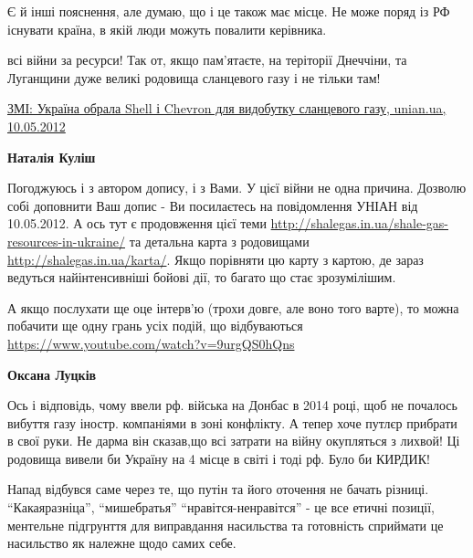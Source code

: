 \begin{itemize}

Є й інші пояснення, але думаю, що і це також має місце. Не може поряд із РФ
існувати країна, в якій люди можуть повалити керівника.


всі війни за ресурси! Так от, якщо пам'ятаєте, на теріторії Днеччіни, та
Луганщини дуже великі родовища сланцевого газу і не тільки там! 

\href{https://www.unian.ua/society/647199-zmi-ukrajina-obrala-shell-i-chevron-dlya-vidobutku-slantsevogo-gazu.html}{%
ЗМІ: Україна обрала Shell і Chevron для видобутку сланцевого газу, %
unian.ua, 10.05.2012%
}

\begin{itemize} %
\textbf{Наталія Куліш} 

Погоджуюсь і з автором допису, і з Вами. У цієї війни не одна причина. Дозволю
собі доповнити Ваш допис - Ви посилаєтесь на повідомлення УНІАН від 10.05.2012.
А ось тут є продовження цієї теми
\url{http://shalegas.in.ua/shale-gas-resources-in-ukraine/} та детальна карта з
родовищами \url{http://shalegas.in.ua/karta/}. Якщо порівняти цю карту з картою, де
зараз ведуться найінтенсивніші бойові дії, то багато що стає зрозумілішим.


А якщо послухати ще оце інтерв'ю (трохи довге, але воно того варте), то можна
побачити ще одну грань усіх подій, що відбуваються
\url{https://www.youtube.com/watch?v=9urgQS0hQns}

\textbf{Оксана Луцків} 

Ось і відповідь, чому ввели рф. війська на Донбас в 2014 році, щоб не почалось
вибуття газу іностр. компаніями в зоні конфлікту. А тепер хоче путлєр прибрати
в свої руки. Не дарма він сказав,що всі затрати на війну окупляться з лихвой!
Ці родовища вивели би Україну на 4 місце в світі і тоді рф. Було би КИРДИК!


\end{itemize} %


Напад відбувся саме через те, що путін та його оточення не бачать різниці.
\enquote{Какаяразніца}, \enquote{мишебратья} \enquote{нравітся-ненравітся} - це все етичні позиції,
ментельне підгрунття для виправдання насильства та готовність сприймати це
насильство як належне щодо самих себе.



\end{itemize}
